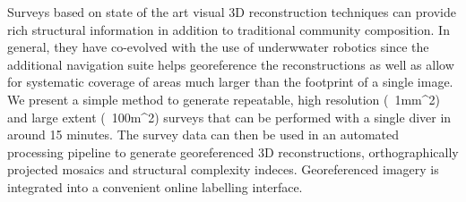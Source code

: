 Surveys based on state of the art visual 3D reconstruction techniques can provide rich structural information in addition to traditional community composition. In general, they have co-evolved with the use of underwwater robotics since the additional navigation suite helps georeference the reconstructions as well as allow for systematic coverage of areas much larger than the footprint of a single image. We present a simple method to generate repeatable, high resolution (~1mm^{2}) and large extent (~100m^{2}) surveys that can be performed with a single diver in around 15 minutes. The survey data can then be used in an automated processing pipeline to generate georeferenced 3D reconstructions, orthographically projected mosaics and structural complexity indeces. Georeferenced imagery is integrated into a convenient online labelling interface. 
